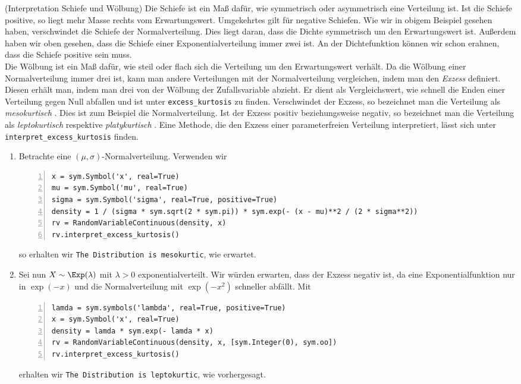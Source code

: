 \begin{Beispiel}{(Interpretation Schiefe und Wölbung)}
Die Schiefe ist ein Maß dafür, wie symmetrisch oder asymmetrisch eine Verteilung ist. Ist die Schiefe positive, so liegt mehr Masse rechts vom Erwartungswert. Umgekehrtes gilt für negative Schiefen. Wie wir in obigem Beispiel gesehen haben, verschwindet die Schiefe der Normalverteilung. Dies liegt daran, dass die Dichte symmetrisch um den Erwartungswert ist. Außerdem haben wir oben gesehen, dass die Schiefe einer Exponentialverteilung immer zwei ist. An der Dichtefunktion können wir schon erahnen, dass die Schiefe positive sein muss.\\

Die Wölbung ist ein Maß dafür, wie steil oder flach sich die Verteilung um den Erwartungswert verhält. Da die Wölbung einer Normalverteilung immer drei ist, kann man andere Verteilungen mit der Normalverteilung vergleichen, indem man den \textit{Exzess}  definiert. Diesen erhält man, indem man drei von der Wölbung der Zufallsvariable abzieht. Er dient als Vergleichswert, wie schnell die Enden einer Verteilung gegen Null abfallen und ist unter \lstinline|excess_kurtosis| zu finden. Verschwindet der Exzess, so bezeichnet man die Verteilung als \textit{mesokurtisch} . Dies ist zum Beispiel die Normalverteilung. Ist der Exzess positiv beziehungsweise negativ, so bezeichnet man die Verteilung als \textit{leptokurtisch}  respektive \textit{platykurtisch} . Eine Methode, die den Exzess einer parameterfreien Verteilung interpretiert, lässt sich unter \lstinline|interpret_excess_kurtosis| finden.

\begin{enumerate}[label=(\roman*)]
\item Betrachte eine $(\mu, \sigma)$-Normalverteilung. Verwenden wir
\begin{lstlisting}[numbers=left, numberstyle=\tiny\color{codegray}]
x = sym.Symbol('x', real=True)
mu = sym.Symbol('mu', real=True)
sigma = sym.Symbol('sigma', real=True, positive=True)
density = 1 / (sigma * sym.sqrt(2 * sym.pi)) * sym.exp(- (x - mu)**2 / (2 * sigma**2))
rv = RandomVariableContinuous(density, x)
rv.interpret_excess_kurtosis()
\end{lstlisting}
so erhalten wir \lstinline|The Distribution is mesokurtic|, wie erwartet.

\item Sei nun $X \sim \Exp(\lambda)$ mit $\lambda > 0$ exponentialverteilt. Wir würden erwarten, dass der Exzess negativ ist, da eine Exponentialfunktion nur in $\exp(-x)$ und die Normalverteilung mit $\exp(-x^2)$ schneller abfällt. Mit
\begin{lstlisting}[numbers=left, numberstyle=\tiny\color{codegray}]
lamda = sym.symbols('lambda', real=True, positive=True)
x = sym.Symbol('x', real=True)
density = lamda * sym.exp(- lamda * x)
rv = RandomVariableContinuous(density, x, [sym.Integer(0), sym.oo])
rv.interpret_excess_kurtosis()
\end{lstlisting}
erhalten wir \lstinline|The Distribution is leptokurtic|, wie vorhergesagt.


\end{enumerate}
\end{Beispiel}

